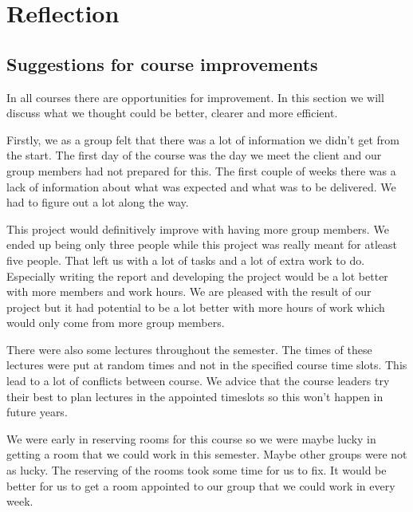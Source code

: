 
\chapter{Reflection}

\section{Suggestions for course improvements}
In all courses there are opportunities for improvement.
In this section we will discuss what we thought could be better, clearer and more efficient.

Firstly, we as a group felt that there was a lot of information we didn't get from the start. 
The first day of the course was the day we meet the client and our group members had not prepared for this.
The first couple of weeks there was a lack of information about what was expected and what was to be delivered.
We had to figure out a lot along the way.

This project would definitively improve with having more group members. 
We ended up being only three people while this project was really meant for atleast five people.
That left us with a lot of tasks and a lot of extra work to do.
Especially writing the report and developing the project would be a lot better with more members and work hours. 
We are pleased with the result of our project but it had potential to be a lot better with more hours of work which would only come from more group members. 

There were also some lectures throughout the semester. 
The times of these lectures were put at random times and not in the specified course time slots.
This lead to a lot of conflicts between course.
We advice that the course leaders try their best to plan lectures in the appointed timeslots so this won't happen in future years. 

We were early in reserving rooms for this course so we were maybe lucky in getting a room that we could work in this semester. 
Maybe other groups were not as lucky. 
The reserving of the rooms took some time for us to fix. 
It would be better for us to get a room appointed to our group that we could work in every week. 